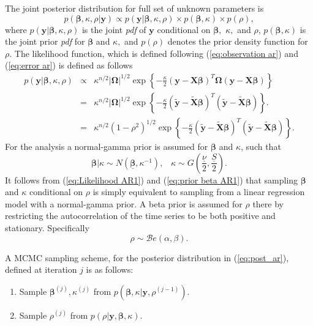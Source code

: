 \documentclass[article]{jss}
\begin{document}
The joint posterior distribution for full set of unknown parameters
is\begin{equation} p(\bm{\beta},\kappa,\rho|\bm{y})\propto
  p(\bm{y}|\bm{\beta},\kappa,\rho)\times p(\bm{\beta},\kappa)\times
  p(\rho),\label{eq:post_ar}\end{equation} where
$p(\bm{y}|\bm{\beta},\kappa,\rho)$ is the joint \emph{pdf} of $\bm{y}$
conditional on $\bm{\beta},$ $\kappa,$ and $\rho$,
$p(\bm{\beta},\kappa)$ is the joint prior \emph{pdf} for $\bm{\beta}$
and $\kappa,$ and $p(\rho)$ denotes the prior density function for
$\rho.$ The likelihood function, which is defined following
(\ref{eq:observation ar}) and (\ref{eq:error ar}) is defined as
follows\begin{eqnarray}
  p(\bm{y}|\bm{\beta},\kappa,\rho) & \propto & \kappa^{n/2}|\bm{\Omega}|^{1/2}\exp\left\{ -\frac{\kappa}{2}\left(\bm{y}-\bm{X}\bm{\beta}\right)^{T}\bm{\Omega}\left(\bm{y}-\bm{X}\bm{\beta}\right)\right\} \nonumber \\
  & = & \kappa^{n/2}|\bm{\Omega}|^{1/2}\exp\left\{ -\frac{\kappa}{2}\left(\tilde{\bm{y}}-\tilde{\bm{X}}\bm{\beta}\right)^{T}\left(\tilde{\bm{y}}-\tilde{\bm{X}}\bm{\beta}\right)\right\} .\nonumber \\
  & = & \kappa^{n/2}\left(1-\rho^{2}\right)^{1/2}\exp\left\{
    -\frac{\kappa}{2}\left(\tilde{\bm{y}}-\tilde{\bm{X}}\bm{\beta}\right)^{T}\left(\tilde{\bm{y}}-\tilde{\bm{X}}\bm{\beta}\right)\right\}
  .\label{eq:Likelihood AR1}\end{eqnarray} For the analysis a
normal-gamma prior is assumed for $\bm{\beta}$ and $\kappa$, such
that\begin{equation} \bm{\beta}|\kappa\sim
  N\left(\underline{\bm{\beta}},\kappa^{-1}\right),\,\,\,\,\,\kappa\sim
  G\left(\frac{\underline{\nu}}{2},\frac{\underline{S}}{2}\right).\label{eq:prior
    beta AR1}\end{equation} It follows from (\ref{eq:Likelihood AR1})
and (\ref{eq:prior beta AR1}) that sampling $\bm{\beta}$ and $\kappa$
conditional on $\rho$ is simply equivalent to sampling from a linear
regression model with a normal-gamma prior. A beta prior is assumed
for $\rho$ there by restricting the autocorrelation of the time series
to be both positive and stationary. Specifically\[
\rho\sim\mathcal{B}e\left(\alpha,\beta\right).\]

A MCMC sampling scheme, for the posterior distribution in (\ref{eq:post_ar}),
defined at iteration $j$ is as follows: 
\begin{enumerate}
\item Sample $\bm{\beta}^{(j)},\kappa^{(j)}$ from $p(\bm{\beta},\kappa|\bm{y},\rho^{(j-1)}).$ 
\item Sample $\rho^{(j)}$ from $p(\rho|\bm{y},\bm{\beta},\kappa).$ 
\end{enumerate}
\end{document}
